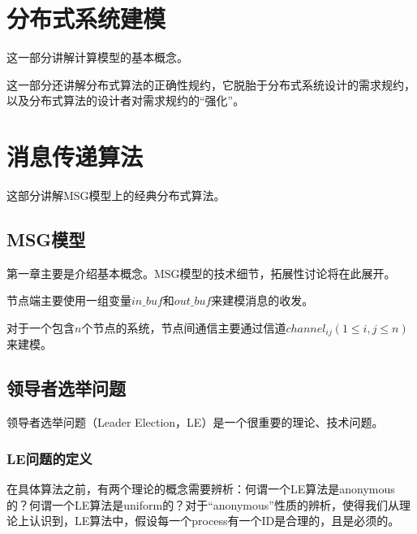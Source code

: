 \documentclass[UTF8]{ctexrep}
\begin{document}
\part{分布式系统建模}

这一部分讲解计算模型的基本概念。

这一部分还讲解分布式算法的正确性规约，它脱胎于分布式系统设计的需求规约，以及分布式算法的设计者对需求规约的“强化”。





\part{消息传递算法} 

这部分讲解MSG模型上的经典分布式算法。


\chapter{MSG模型} \label{Chap_MSG}

第一章主要是介绍基本概念。MSG模型的技术细节，拓展性讨论将在此展开。

节点端主要使用一组变量$in\_buf$和$out\_buf$来建模消息的收发。

对于一个包含$n$个节点的系统，节点间通信主要通过信道$channel_{ij} (1\leq i, j \leq n)$来建模。



\chapter{领导者选举问题}

领导者选举问题（Leader Election，LE）是一个很重要的理论、技术问题。

\section{LE问题的定义}

在具体算法之前，有两个理论的概念需要辨析：何谓一个LE算法是anonymous的？何谓一个LE算法是uniform的？对于“anonymous”性质的辨析，使得我们从理论上认识到，LE算法中，假设每一个process有一个ID是合理的，且是必须的。
\end{document}
